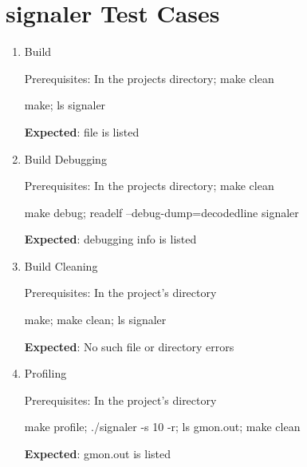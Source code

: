 \documentclass{article}
\begin{document}
\section{{\footnotesize signaler} Test Cases}

\begin{enumerate}
    \item Build
    
    Prerequisites: In the projects directory; {\footnotesize make clean}
    
    {\footnotesize make; ls signaler}
    
    \textbf{Expected}: file is listed
    
    \item Build Debugging
    
    Prerequisites: In the projects directory; {\footnotesize make clean}
    
    {\footnotesize make debug; readelf --debug-dump=decodedline signaler}
    
    \textbf{Expected}: debugging info is listed
    
    \item Build Cleaning
    
    Prerequisites: In the project's directory
    
    {\footnotesize make; make clean; ls signaler}
    
    \textbf{Expected}: No such file or directory errors
    
    \item Profiling
    
    Prerequisites: In the project's directory
    
    {\footnotesize make profile; ./signaler -s 10 -r; ls gmon.out; make clean}
    
    \textbf{Expected}: gmon.out is listed
\end{enumerate}
\end{document}
